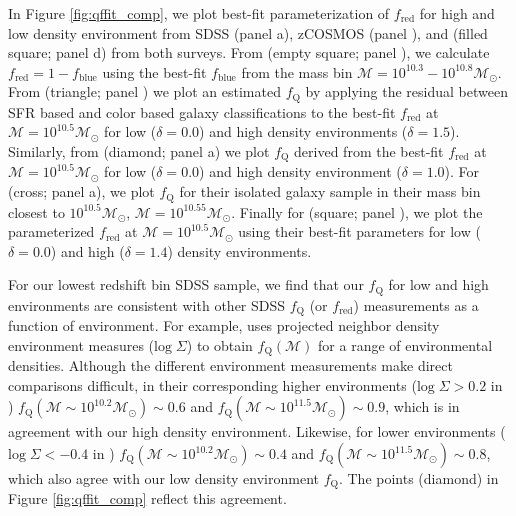 \documentclass{emulateapj}
\begin{document}
In Figure \ref{fig:qffit_comp}, we plot  best-fit parameterization of
$f_{\mathrm{red}}$ for high and low density environment from SDSS (panel a), zCOSMOS (panel \iovinopanel), and \cite{Peng:2010aa} (filled square; panel d) from both surveys. 
From \cite{Iovino:2010aa} (empty square; panel \iovinopanel), we calculate $f_{\mathrm{red}} = 1-f_{\mathrm{blue}}$
using the best-fit $f_{\mathrm{blue}}$ from the mass bin $\mathcal{M} =
10^{10.3} - 10^{10.8} \mathcal{M}_{\odot}$. From \cite{Kovac:2014aa} (triangle; panel \kovacpanel)
we plot an estimated $f_{\mathrm{Q}}$ by applying the residual between SFR
based and color based galaxy classifications to the best-fit
$f_{\mathrm{red}}$ at $\mathcal{M} = 10^{10.5} \mathcal{M}_{\odot}$ for
low ($\delta = 0.0$) and high density environments ($\delta =
1.5$). Similarly, from \cite{Baldry:2006aa} (diamond; panel a) we plot $f_{\mathrm{Q}}$
derived from the best-fit $f_{\mathrm{red}}$ at $\mathcal{M} = 10^{10.5}
\mathcal{M}_{\odot}$ for low ($\delta = 0.0$) and high density
environment ($\delta = 1.0$). For \cite{geha12a} (cross; panel a), we plot $f_{\mathrm{Q}}$
for their isolated galaxy sample in their mass bin closest to $10^{10.5} \mathcal{M}_{\odot}$, $\mathcal{M} = 10^{10.55} \mathcal{M}_{\odot}$. Finally for \cite{Peng:2010aa} (square; panel \pengpanel), we plot the parameterized $f_{\mathrm{red}}$ at $\mathcal{M} = 10^{10.5} \mathcal{M}_{\odot}$ using their best-fit parameters for low ($\delta =0.0$) and high ($\delta = 1.4$) density environments. 

For our lowest redshift bin SDSS sample, we find that our $f_{\mathrm{Q}}$
for low and high environments are consistent with other SDSS
$f_{\mathrm{Q}}$ (or $f_{\mathrm{red}}$) measurements as a function of
environment. For example, \cite{Baldry:2006aa} uses projected neighbor
density environment measures ($\mathrm{log} \; \Sigma$) to obtain
$f_{\mathrm{Q}}(\mathcal{M})$ for a range of environmental
densities. Although the different environment measurements make direct
comparisons difficult, in their corresponding higher environments
($\mathrm{log} \; \Sigma > 0.2$ in \citealt{Baldry:2006aa})
$f_{\mathrm{Q}}(\mathcal{M} \sim 10^{10.2} \mathcal{M}_{\odot}) \sim 0.6$
and $f_{\mathrm{Q}}(\mathcal{M} \sim 10^{11.5} \mathcal{M}_{\odot}) \sim
0.9$, which is in agreement with our high density
environment. Likewise, for lower environments ($\mathrm{log} \; \Sigma <
-0.4$ in \citealt{Baldry:2006aa}) $f_{\mathrm{Q}}(\mathcal{M} \sim
10^{10.2} \mathcal{M}_{\odot}) \sim 0.4$ and $f_{\mathrm{Q}}(\mathcal{M}
\sim 10^{11.5} \mathcal{M}_{\odot}) \sim 0.8$, which also agree with
our low density environment $f_{\mathrm{Q}}$. The \cite{Baldry:2006aa}
points (diamond) in Figure \ref{fig:qffit_comp} reflect this
agreement.
\end{document}
